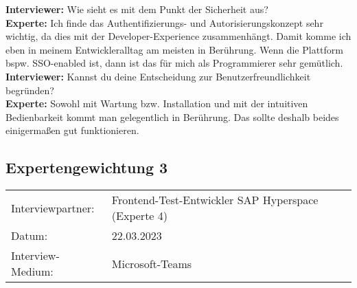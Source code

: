\begin{linenumbers}
    \textbf{Interviewer:} Wie sieht es mit dem Punkt der Sicherheit aus?\\
    \textbf{Experte:} Ich finde das Authentifizierungs- und Autorisierungskonzept sehr wichtig, da dies mit der Developer-Experience zusammenhängt. Damit komme ich eben in meinem Entwickleralltag am meisten in Berührung. Wenn die Plattform bspw. SSO-enabled ist, dann ist das für mich als Programmierer sehr gemütlich.\\ 
    \textbf{Interviewer:} Kannst du deine Entscheidung zur Benutzerfreundlichkeit begründen?\\
    \textbf{Experte:} Sowohl mit Wartung bzw. Installation und mit der intuitiven Bedienbarkeit kommt man gelegentlich in Berührung. Das sollte deshalb beides einigermaßen gut funktionieren.\\
\end{linenumbers}

\newpage
\subsection{Expertengewichtung 3}
        \begin{tabular}{ l l }
    Interviewpartner: & Frontend-Test-Entwickler SAP Hyperspace (Experte 4)\\
    Datum: & 22.03.2023\\
    Interview-Medium: & Microsoft-Teams\\
\end{tabular}
\begin{center}
\begin{figure}[H]
    \centering
    \label{fig:gew_31}
\end{figure}	
\end{center}
\begin{center}
\begin{figure}[H]
    \centering
    \label{fig:gew_32}
\end{figure}	
\end{center}


